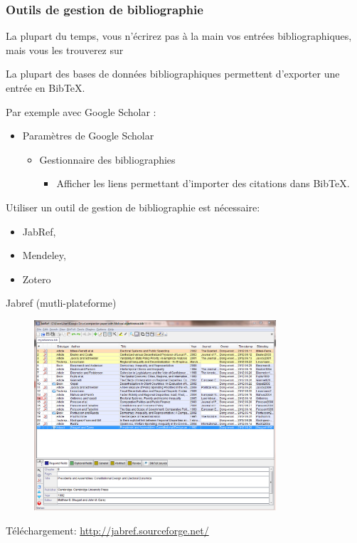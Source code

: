 \documentclass{beamer}
\begin{document}
\begin{frame}
\frametitle{Outils de gestion de bibliographie}

La plupart du temps, vous n'écrirez pas à la main vos entrées bibliographiques, mais vous les trouverez sur
\begin{center}
\Huge {}
\end{center}
La plupart des bases de données bibliographiques permettent d'exporter une entrée en BibTeX.

\medskip
Par exemple avec Google Scholar :
\begin{itemize}
  \item Paramètres de Google Scholar
    \begin{itemize}
      \item Gestionnaire des bibliographies
        \begin{itemize}
          \item Afficher les liens permettant d'importer des citations dans BibTeX.
        \end{itemize}
    \end{itemize}
\end{itemize}

\medskip
Utiliser un outil de gestion de bibliographie est nécessaire:
\begin{itemize}
\item JabRef,
\item Mendeley,
\item Zotero
\end{itemize}
\end{frame}


\begin{frame}{Jabref (mutli-plateforme)}

\vspace*{-0.5cm}
\begin{figure} %
\centering %
\includegraphics[width=9cm]{img/jabref} %
\end{figure} %

\vspace*{-0.5cm}
{\footnotesize Téléchargement: \url{http://jabref.sourceforge.net/}}

\end{frame}
\end{document}
